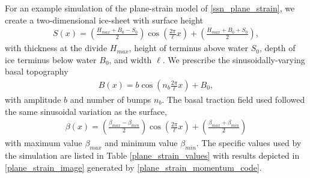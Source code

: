 For an example simulation of the plane-strain model of \cref{ssn_plane_strain}, we create a two-dimensional ice-sheet with surface height 
{\small
\begin{align*}
  S(x) = \left( \frac{ H_{max} + B_0 - S_0 }{2} \right) \cos\left( \frac{2\pi}{\ell} x \right) + \left( \frac{H_{max} + B_0 + S_0}{2} \right),
\end{align*}}
with thickness at the divide $H_{max}$, height of terminus above water $S_0$, depth of ice terminus below water $B_0$, and width $\ell$.  We prescribe the sinusoidally-varying basal topography
\begin{align*}
  B(x) = b \cos\left( n_b \frac{2\pi}{\ell} x \right) + B_0,
\end{align*}
with amplitude $b$ and number of bumps $n_b$.  The basal traction field used followed the same sinusoidal variation as the surface,
\begin{align*}
  \beta(x) = \left( \frac{\beta_{max} - \beta_{min}}{2} \right) \cos\left( \frac{2\pi}{\ell} x \right) + \left( \frac{\beta_{max} + \beta_{min}}{2} \right)
\end{align*}
with maximum value $\beta_{max}$ and minimum value $\beta_{min}$.  The specific values used by the simulation are listed in Table \cref{plane_strain_values} with results depicted in \cref{plane_strain_image} generated by \cref{plane_strain_momentum_code}.

